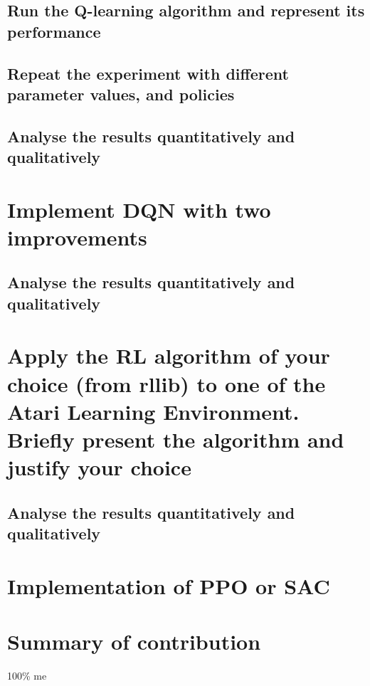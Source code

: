 \documentclass[a4pape, 11pt, english]{article}
\begin{document}
\subsection{Run the Q-learning algorithm and represent its performance}

\subsection{Repeat the experiment with different parameter values, and policies}

\subsection{Analyse the results quantitatively and qualitatively}

\section{Implement DQN with two improvements}

\subsection{Analyse the results quantitatively and qualitatively}

\section{Apply the RL algorithm of your choice (from rllib) to one of the Atari Learning Environment. Briefly present the algorithm and justify your choice}

\subsection{Analyse the results quantitatively and qualitatively}

\section{Implementation of PPO or SAC}

\section{Summary of contribution}
100\% me


\end{document}

